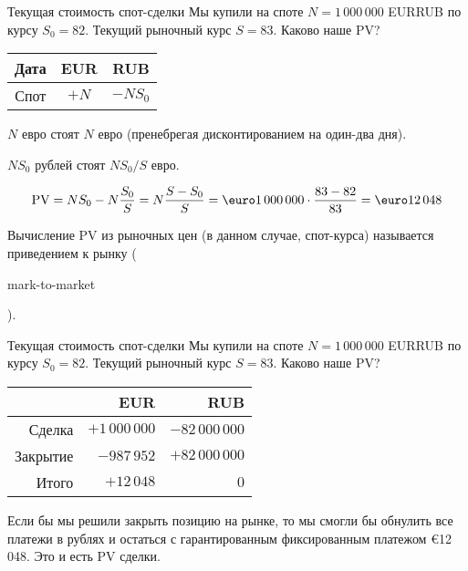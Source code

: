 \documentclass{beamer}
\renewcommand{\EUR}[1]{\textup{\euro}#1}
\newcommand{\en}[1]{\begin{otherlanguage}{english}#1\end{otherlanguage}}
\begin{document}
\begin{frame}{Текущая стоимость спот-сделки}
\justify
Мы купили на споте $N=1\,000\,000$ EURRUB по курсу $S_0 = 82$. Текущий рыночный курс $S=83$. Каково наше PV?

\justify
\centering
\begin{tabular}{c|c|c}
Дата & EUR  & RUB \\ \hline
Спот & $+N$ & $-NS_0$
\end{tabular}

\justify
$N$ евро стоят $N$ евро (пренебрегая дисконтированием на один-два дня).

\justify
$NS_0$ рублей стоят $NS_0/S$ евро.

\begin{align*}
\text{PV} = NS_0 - N\frac{S_0}{S} = N\frac{S - S_0}{S} = \EUR{1\,000\,000} \cdot \frac{83-82}{83} = \EUR{12\,048}
\end{align*}

\justify
Вычисление PV из рыночных цен (в данном случае, спот-курса) называется \alert{приведением к рынку} (\en{mark-to-market}).
\end{frame}



\begin{frame}{Текущая стоимость спот-сделки}
\justify
Мы купили на споте $N=1\,000\,000$ EURRUB по курсу $S_0 = 82$. Текущий рыночный курс $S=83$. Каково наше PV?

\justify
\centering
\begin{tabular}{r|r|r}
         & EUR               & RUB \\ \hline
Сделка   & $+1\,000\,000$ & $-82\,000\,000$ \\
Закрытие &    $-987\,952$ & $+82\,000\,000$ \\ \hline
Итого    &     $+12\,048$ & $0$
\end{tabular}

\justify
Если бы мы решили закрыть позицию на рынке, то мы смогли бы обнулить все платежи в рублях и остаться с гарантированным фиксированным платежом \EUR{12\,048}. Это и есть PV сделки.
\end{frame}
\end{document}
